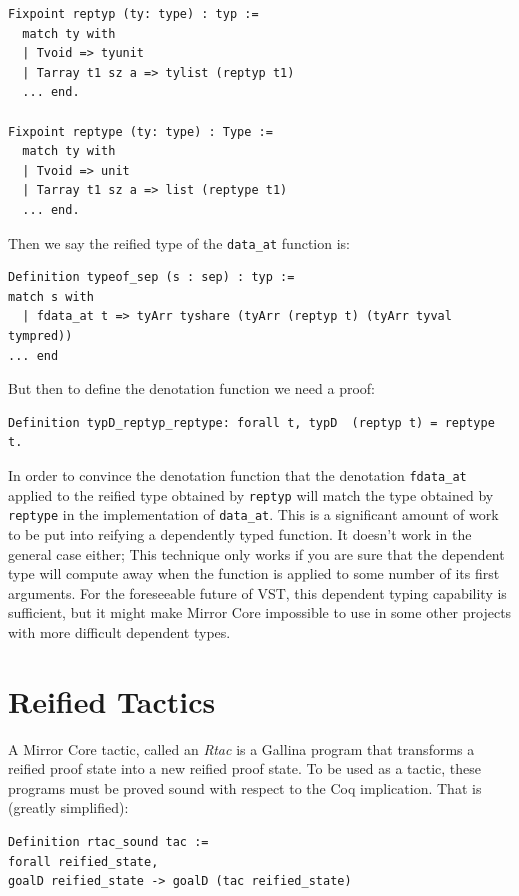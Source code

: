 \documentclass{puthesis}
\begin{document}
\begin{lstlisting}
Fixpoint reptyp (ty: type) : typ :=
  match ty with
  | Tvoid => tyunit
  | Tarray t1 sz a => tylist (reptyp t1)
  ... end.

Fixpoint reptype (ty: type) : Type :=
  match ty with
  | Tvoid => unit
  | Tarray t1 sz a => list (reptype t1)
  ... end.
\end{lstlisting}

Then we say the reified type of the \lstinline|data_at| function is:

\begin{lstlisting}
Definition typeof_sep (s : sep) : typ :=
match s with
  | fdata_at t => tyArr tyshare (tyArr (reptyp t) (tyArr tyval tympred))
... end
\end{lstlisting}

But then to define the denotation function we need a proof:

\begin{lstlisting}
Definition typD_reptyp_reptype: forall t, typD  (reptyp t) = reptype t.
\end{lstlisting}

In order to convince the denotation function that the denotation
\lstinline|fdata_at| applied to the reified type obtained by
\lstinline|reptyp| will match the type obtained by \lstinline|reptype|
in the implementation of \lstinline|data_at|. This is a significant
amount of work to be put into reifying a dependently typed
function. It doesn't work in the general case either; This technique
only works if you are sure that the dependent type will compute away
when the function is applied to some number of its first
arguments. For the foreseeable future of VST, this dependent typing
capability is sufficient, but it might make Mirror Core impossible to
use in some other projects with more difficult dependent types.

\section{Reified Tactics}

A Mirror Core tactic, called an \emph{Rtac} is a Gallina program that transforms
a reified proof state into a new reified proof state. To be used as a
tactic, these programs must be proved sound with respect to the Coq
implication. That is (greatly simplified):

\begin{lstlisting}
Definition rtac_sound tac := 
forall reified_state,
goalD reified_state -> goalD (tac reified_state)
\end{lstlisting}
\end{document}
